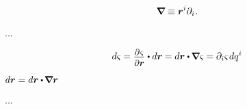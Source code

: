 \nopagebreak\vspace{-0.2em}\begin{equation}
\bm{\nabla}\hspace{-0.2ex} \equiv \bm{r}^i \partial_i \hspace{.1ex} .
\end{equation}

...

\begin{equation}
d \varsigma \hspace{-0.1ex}
=
\scalebox{0.9}{$ \displaystyle\frac{\raisebox{-0.2em}{$\partial \hspace{.15ex} \varsigma$}}{\raisebox{-0.05em}{$\partial \locationvector$}} $} \dotp d\locationvector \hspace{-0.1ex}
=
d\locationvector \dotp \hspace{-0.11ex} \boldnabla \varsigma \hspace{-0.1ex}
=
\partial_i \varsigma \hspace{.15ex} dq^i
\end{equation}

\vspace{1.1em}${
d\locationvector = d\locationvector \dotp \hspace{-0.2ex} \tikzmark{beginItsUnitTensorE} \boldnabla \locationvector \tikzmark{endItsUnitTensorE}
}$%

...

  

